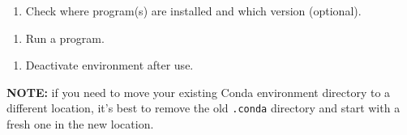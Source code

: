 \documentclass[
]{book}
\newenvironment{Shaded}{\begin{snugshade}}{\end{snugshade}}
\newcommand{\NormalTok}[1]{#1}
\newcommand{\OperatorTok}[1]{\textcolor[rgb]{0.81,0.36,0.00}{\textbf{#1}}}
\newcommand{\StringTok}[1]{\textcolor[rgb]{0.31,0.60,0.02}{#1}}
\providecommand{\tightlist}{%
  \setlength{\itemsep}{0pt}\setlength{\parskip}{0pt}}
\begin{document}
\begin{Shaded}
\end{Shaded}

\begin{enumerate}
\def\labelenumi{\arabic{enumi}.}
\setcounter{enumi}{10}
\tightlist
\item
  Check where program(s) are installed and which version (optional).
\end{enumerate}

\begin{Shaded}
\end{Shaded}

\begin{enumerate}
\def\labelenumi{\arabic{enumi}.}
\setcounter{enumi}{11}
\tightlist
\item
  Run a program.
\end{enumerate}

\begin{Shaded}
\end{Shaded}

\begin{enumerate}
\def\labelenumi{\arabic{enumi}.}
\setcounter{enumi}{12}
\tightlist
\item
  Deactivate environment after use.
\end{enumerate}

\begin{Shaded}
\end{Shaded}

\textbf{NOTE:} if you need to move your existing Conda environment directory to a different location, it's best to remove the old \texttt{.conda} directory and start with a fresh one in the new location.
\end{document}

